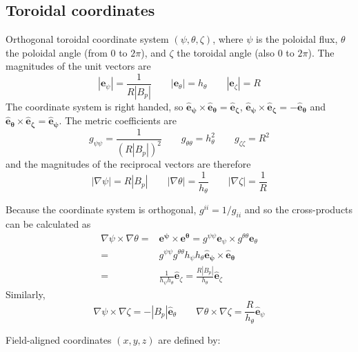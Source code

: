\documentclass[12pt, a4paper]{article}
\begin{document}
\subsection{Toroidal coordinates}

Orthogonal toroidal coordinate system $\left(\psi, \theta, \zeta\right)$, 
where $\psi$ is the poloidal flux, $\theta$ the poloidal angle
(from $0$ to $2\pi$), and $\zeta$ the toroidal angle (also $0$ to $2\pi$).
The magnitudes of the unit vectors are
\begin{equation}
\left|\mathbf{e}_\psi\right| = \frac{1}{R\left|B_p\right|} \qquad
\left|\mathbf{e}_\theta\right| = h_\theta \qquad
\left|\mathbf{e}_\zeta\right| = R
\label{eq:fluxmags}
\end{equation}
The coordinate system is right handed, so $\mathbf{\hat{e}_\psi\times\hat{e}_\theta = \hat{e}_\zeta}$,
$\mathbf{\hat{e}_\psi\times\hat{e}_\zeta = -\hat{e}_\theta}$ and $\mathbf{\hat{e}_\theta\times\hat{e}_\zeta = \hat{e}_\psi}$. The metric coefficients are
\begin{equation}
g_{\psi\psi} = \frac{1}{\left(R\left|B_p\right|\right)^2} \qquad
g_{\theta\theta} = h_\theta^2 \qquad
g_{\zeta\zeta} = R^2
\end{equation}
and the magnitudes of the reciprocal vectors are therefore
\begin{equation}
\left|\nabla\psi\right| = R\left|B_p\right| \qquad
\left|\nabla\theta\right| = \frac{1}{h_\theta} \qquad
\left|\nabla\zeta\right| = \frac{1}{R}
\label{eq:fluxmags2}
\end{equation}

Because the coordinate system is orthogonal, $g^{ii} = 1/g_{ii}$ and so the cross-products can be calculated as
\begin{eqnarray*}
\nabla\psi\times\nabla\theta = &\mathbf{e^\psi\times e^\theta} = 
g^{\psi\psi}\mathbf{e}_\psi\times g^{\theta\theta}\mathbf{e}_\theta \nonumber \\
= & g^{\psi\psi}g^{\theta\theta}h_\psi h_\theta\mathbf{\hat{e}_\psi\times\hat{e}_\theta} \nonumber \\
= &\frac{1}{h_\psi h_\theta}\mathbf{\hat{e}}_\zeta 
= \frac{R\left|B_p\right|}{h_\theta}\mathbf{\hat{e}}_\zeta
\end{eqnarray*}
Similarly, 
\[
\nabla\psi\times\nabla\zeta = -\left|B_p\right|\mathbf{\hat{e}}_\theta \qquad
\nabla\theta\times\nabla\zeta = \frac{R}{h_\theta}\mathbf{\hat{e}}_\psi
\]

Field-aligned coordinates $(x,y,z)$ are defined by:
\end{document}
